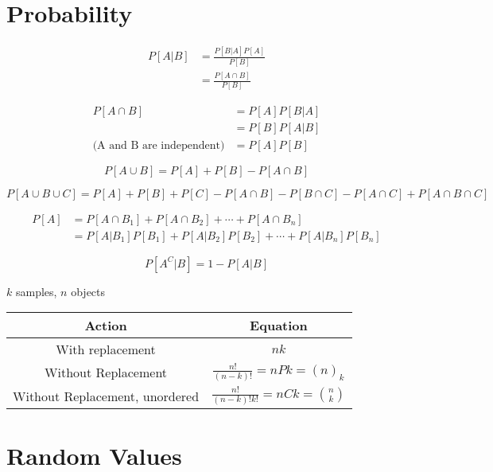 \documentclass{article}
\theoremstyle{remark}
\begin{document}
\section{Probability}
\begin{align*}
    P[A|B] & = \frac{P[B|A] P[A]}{P[B]} \\
           & = \frac{P[A \cap B]}{P[B]}
\end{align*}

\begin{align*}
    P[A \cap B]                      & =P[A] P[B|A]  \\
                                     & = P[B] P[A|B] \\
    \text{(A and B are independent)} & = P[A] P[B]
\end{align*}

\[
    P[A \cup B] = P[A] + P[B] - P[A \cap B]
\]

\[
    P[A \cup B \cup C] = P[A] + P[B] + P[C] - P[A \cap B] - P[B \cap C] - P[A \cap C] + P[A \cap B \cap C]
\]

\begin{align*}
    P[A] & = P[A \cap B_1] + P[A \cap B_2] + \cdots + P[A\cap B_n]       \\
         & = P[A|B_1] P[B_1]+ P[A|B_2] P[B_2] + \cdots + P[A|B_n] P[B_n]
\end{align*}

\[
    P[A^C | B] = 1 - P[A|B]
\]

\(k\) samples, \(n\) objects

\begin{table}[!htbp]
    \centering
    \begin{tabular}{ c c }
        \toprule
        Action                         & Equation                                      \\
        \midrule
        With replacement               & \(nk\)                                        \\
        Without Replacement            & \(\frac{n!}{(n-k)!} = nPk = {(n)}_k\)         \\
        Without Replacement, unordered & \(\frac{n!}{(n-k)!k!} = nCk = {n \choose k}\) \\
        \bottomrule
    \end{tabular}
\end{table}

\section{Random Values}
\end{document}
